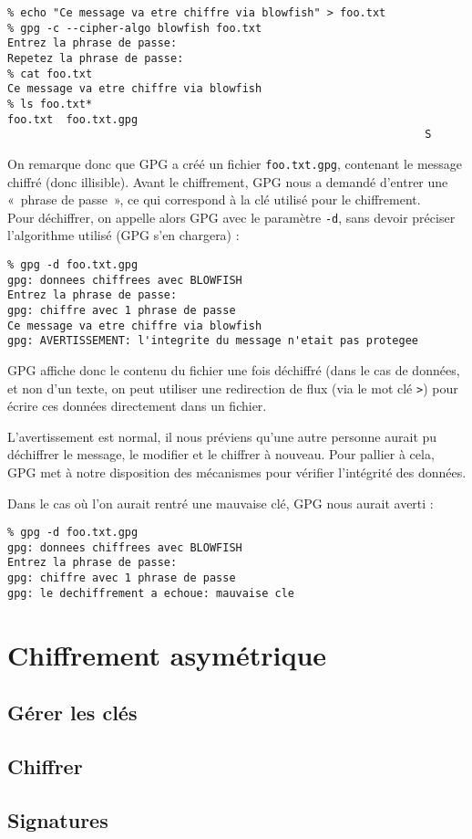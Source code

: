 \begin{lstlisting}
% echo "Ce message va etre chiffre via blowfish" > foo.txt
% gpg -c --cipher-algo blowfish foo.txt
Entrez la phrase de passe: 
Repetez la phrase de passe: 
% cat foo.txt
Ce message va etre chiffre via blowfish
% ls foo.txt*
foo.txt  foo.txt.gpg
                                                                S
\end{lstlisting}

On remarque donc que GPG a créé un fichier \texttt{foo.txt.gpg},
contenant le message chiffré (donc illisible). 
Avant le chiffrement, GPG nous a
demandé d'entrer une «~phrase de passe~», ce qui correspond à la
clé utilisé pour le chiffrement.
\\

Pour déchiffrer, on appelle alors GPG avec le paramètre
\texttt{-d}, sans devoir préciser l'algorithme utilisé (GPG s'en
chargera) : 

\begin{lstlisting}
% gpg -d foo.txt.gpg 
gpg: donnees chiffrees avec BLOWFISH
Entrez la phrase de passe: 
gpg: chiffre avec 1 phrase de passe
Ce message va etre chiffre via blowfish
gpg: AVERTISSEMENT: l'integrite du message n'etait pas protegee
\end{lstlisting}

GPG affiche donc le contenu du fichier une fois déchiffré (dans le
cas de données, et non d'un texte, on peut utiliser une
redirection de flux (via le mot clé \texttt{>}) pour écrire ces 
données directement dans un fichier.

L'avertissement est normal, il nous préviens qu'une autre personne
aurait pu déchiffrer le message, le modifier et le chiffrer à
nouveau. Pour pallier à cela, GPG met à notre disposition des
mécanismes pour vérifier l'intégrité des données. 

Dans le cas où l'on aurait rentré une mauvaise clé, GPG nous
aurait averti : 
\begin{lstlisting}
% gpg -d foo.txt.gpg
gpg: donnees chiffrees avec BLOWFISH
Entrez la phrase de passe:
gpg: chiffre avec 1 phrase de passe
gpg: le dechiffrement a echoue: mauvaise cle
\end{lstlisting}

\section{Chiffrement asymétrique}
\subsection{Gérer les clés}
\subsection{Chiffrer}
\subsection{Signatures}
